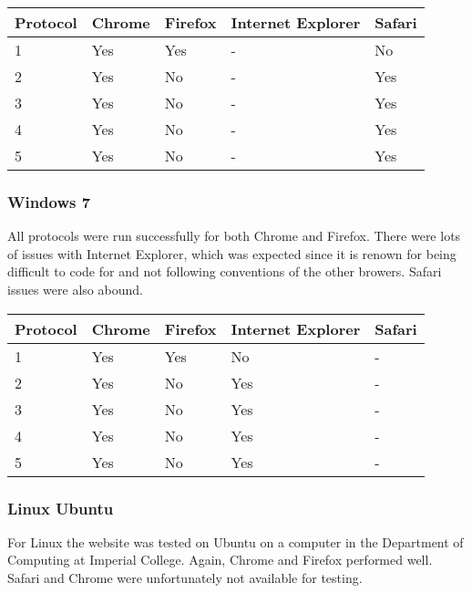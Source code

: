 \documentclass[a4paper,11pt,titlepage]{article}
\begin{document}
\begin{center}
 \begin{tabular}{ | l || l | l | l | l |}
    \hline
    Protocol & Chrome & Firefox & Internet Explorer & Safari \\ \hline \hline
    1 & Yes & Yes  & - & No   \\ \hline
    2 & Yes & No & - & Yes \\ \hline
   3 & Yes & No & - & Yes  \\ \hline
   4 & Yes & No & - & Yes  \\ \hline
   5 & Yes & No & - & Yes  \\
    \hline
  \end{tabular}
\end{center}

\subsubsection*{Windows 7}

All protocols were run successfully for both Chrome and Firefox. There were lots of issues with Internet Explorer, which was expected since it is renown for being difficult to code for and not following conventions of the other browers. Safari issues were also abound.

\begin{center}

  \begin{tabular}{ | l || l | l | l | l |}
    \hline
    Protocol & Chrome & Firefox & Internet Explorer & Safari \\ \hline \hline
    1 & Yes & Yes  & No  & - \\ \hline
    2 & Yes & No & Yes & - \\ \hline
   3 & Yes & No & Yes & - \\ \hline
   4 & Yes & No & Yes & - \\ \hline
   5 & Yes & No & Yes & - \\
    \hline
  \end{tabular}

\end{center}

\subsubsection*{Linux Ubuntu}

For Linux the website was tested on Ubuntu on a computer in the Department of Computing at Imperial College. Again, Chrome and Firefox performed well. Safari and Chrome were unfortunately not available for testing.
\end{document}
